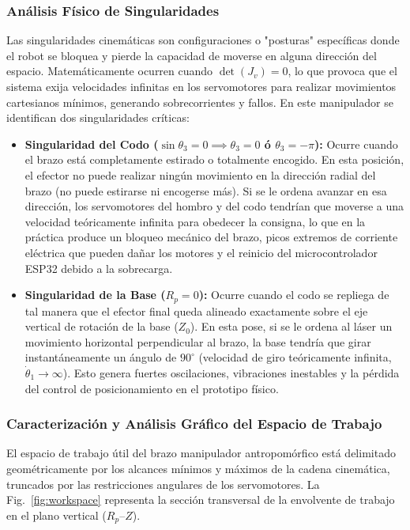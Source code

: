\documentclass[conference,a4paper]{IEEEtran}
\begin{document}
\subsubsection{Análisis Físico de Singularidades}
Las singularidades cinemáticas son configuraciones o "posturas" específicas donde el robot se bloquea y pierde la capacidad de moverse en alguna dirección del espacio. Matemáticamente ocurren cuando $\det(J_v) = 0$, lo que provoca que el sistema exija velocidades infinitas en los servomotores para realizar movimientos cartesianos mínimos, generando sobrecorrientes y fallos. En este manipulador se identifican dos singularidades críticas:
\begin{itemize}
    \item \textbf{Singularidad del Codo ($\sin\theta_3 = 0 \implies \theta_3 = 0$ ó $\theta_3 = -\pi$):} Ocurre cuando el brazo está completamente estirado o totalmente encogido. En esta posición, el efector no puede realizar ningún movimiento en la dirección radial del brazo (no puede estirarse ni encogerse más). Si se le ordena avanzar en esa dirección, los servomotores del hombro y del codo tendrían que moverse a una velocidad teóricamente infinita para obedecer la consigna, lo que en la práctica produce un bloqueo mecánico del brazo, picos extremos de corriente eléctrica que pueden dañar los motores y el reinicio del microcontrolador ESP32 debido a la sobrecarga.
    \item \textbf{Singularidad de la Base ($R_p = 0$):} Ocurre cuando el codo se repliega de tal manera que el efector final queda alineado exactamente sobre el eje vertical de rotación de la base ($Z_0$). En esta pose, si se le ordena al láser un movimiento horizontal perpendicular al brazo, la base tendría que girar instantáneamente un ángulo de $90^\circ$ (velocidad de giro teóricamente infinita, $\dot{\theta}_1 \to \infty$). Esto genera fuertes oscilaciones, vibraciones inestables y la pérdida del control de posicionamiento en el prototipo físico.
\end{itemize}

\subsubsection{Caracterización y Análisis Gráfico del Espacio de Trabajo}
El espacio de trabajo útil del brazo manipulador antropomórfico está delimitado geométricamente por los alcances mínimos y máximos de la cadena cinemática, truncados por las restricciones angulares de los servomotores. La Fig.~\ref{fig:workspace} representa la sección transversal de la envolvente de trabajo en el plano vertical ($R_p$--$Z$).
\end{document}
